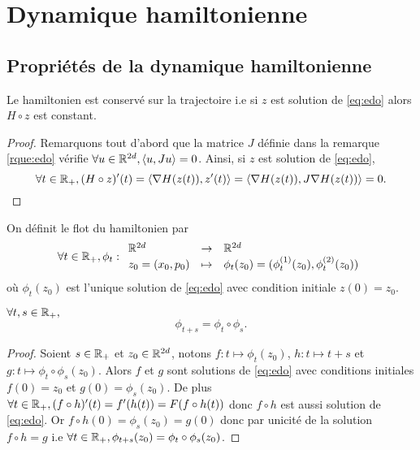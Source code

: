 \documentclass[10pt,a4paper]{article}
\begin{document}


\section{Dynamique hamiltonienne}

\subsection{Propriétés de la dynamique hamiltonienne}
\begin{Prop}\label{prop:conservation}
	Le hamiltonien est conservé sur la trajectoire i.e si $z$ est solution de \eqref{eq:edo} alors $H \circ z$ est constant.
\end{Prop}

\begin{proof}
	Remarquons tout d'abord que la matrice $J$ définie dans la remarque \ref{rque:edo} vérifie $\forall u \in \mathbb{R}^{2d}, { \left\langle u, Ju \right\rangle} = 0$. Ainsi, si $z$ est solution de \eqref{eq:edo},
	$$
	\forall t \in \mathbb{R}_+, (H \circ z)'(t) = { \left\langle \nabla H (z(t)), z'(t) \right\rangle} = { \left\langle \nabla H (z(t)), J \nabla H(z(t)) \right\rangle} = 0.
	$$
\end{proof}

\begin{Def}
	On définit le flot du hamiltonien par
	$$
	\forall t \in \mathbb{R}_+, \phi_t : { \begin{array}{lcl} 
		\mathbb{R}^{2d} & \to & \mathbb{R}^{2d} \\
		z_0 = (x_0, p_0) &\mapsto & \phi_t(z_0) = (\phi_t^{(1)}(z_0), \phi_t^{(2)}(z_0))
	 \end{array} }
	$$
	où $\phi_t(z_0)$ est l'unique solution de \eqref{eq:edo} avec condition initiale $z(0) = z_0$.
\end{Def}

\begin{Pte}\label{prop:compo}  $\forall t, s \in \mathbb{R}_+,$
  $$
  \phi_{t+s} = \phi_t \circ \phi_s.
  $$
\end{Pte}
\begin{proof}
  Soient $s \in \mathbb{R}_+$ et $z_0 \in \mathbb{R}^{2d}$, notons $f : t \mapsto \phi_{t}(z_0)$, $h : t \mapsto t+s$ et $g : t \mapsto \phi_t \circ \phi_s (z_0)$. Alors $f$ et $g$ sont solutions de \eqref{eq:edo} avec conditions initiales $f(0) = z_0$ et $g(0) = \phi_s(z_0)$. De plus $\forall t \in \mathbb{R}_+, (f\circ h)'(t) = f'(h(t)) = F(f \circ h(t))$ donc $f \circ h$ est aussi solution de \eqref{eq:edo}. Or $f \circ h (0) = \phi_s(z_0) = g(0)$ donc par unicité de la solution $f \circ h = g$ i.e $\forall t \in \mathbb{R}_+, \phi_{t+s}(z_0) = \phi_t \circ \phi_s (z_0)$. 
\end{proof}
\end{document}

